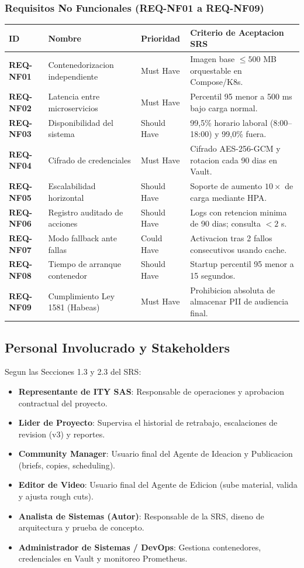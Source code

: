 \documentclass[11pt,a4paper]{article}
\begin{document}
\subsubsection*{Requisitos No Funcionales (REQ-NF01 a REQ-NF09)}
\begin{longtable}{p{2.2cm}p{4.5cm}p{2.5cm}p{5.8cm}}
\toprule
ID & Nombre & Prioridad & Criterio de Aceptacion SRS \\
\midrule
\endhead
\bottomrule
\endfoot
\textbf{REQ-NF01} & Contenedorizacion independiente & Must Have & Imagen base $\le 500$ MB orquestable en Compose/K8s. \\
\textbf{REQ-NF02} & Latencia entre microservicios & Must Have & Percentil 95 menor a 500 ms bajo carga normal. \\
\textbf{REQ-NF03} & Disponibilidad del sistema & Should Have & 99,5\% horario laboral (8:00--18:00) y 99,0\% fuera. \\
\textbf{REQ-NF04} & Cifrado de credenciales & Must Have & Cifrado AES-256-GCM y rotacion cada 90 dias en Vault. \\
\textbf{REQ-NF05} & Escalabilidad horizontal & Should Have & Soporte de aumento $10\times$ de carga mediante HPA. \\
\textbf{REQ-NF06} & Registro auditado de acciones & Should Have & Logs con retencion minima de 90 dias; consulta $<2$ s. \\
\textbf{REQ-NF07} & Modo fallback ante fallas & Could Have & Activacion tras 2 fallos consecutivos usando cache. \\
\textbf{REQ-NF08} & Tiempo de arranque contenedor & Should Have & Startup percentil 95 menor a 15 segundos. \\
\textbf{REQ-NF09} & Cumplimiento Ley 1581 (Habeas) & Must Have & Prohibicion absoluta de almacenar PII de audiencia final. \\
\end{longtable}

\subsection{Personal Involucrado y Stakeholders}\label{_partes_interesadas_stakeholders}
Segun las Secciones 1.3 y 2.3 del SRS:
\begin{itemize}
  \item \textbf{Representante de ITY SAS}: Responsable de operaciones y aprobacion contractual del proyecto.
  \item \textbf{Lider de Proyecto}: Supervisa el historial de retrabajo, escalaciones de revision (v3) y reportes.
  \item \textbf{Community Manager}: Usuario final del Agente de Ideacion y Publicacion (briefs, copies, scheduling).
  \item \textbf{Editor de Video}: Usuario final del Agente de Edicion (sube material, valida y ajusta rough cuts).
  \item \textbf{Analista de Sistemas (Autor)}: Responsable de la SRS, diseno de arquitectura y prueba de concepto.
  \item \textbf{Administrador de Sistemas / DevOps}: Gestiona contenedores, credenciales en Vault y monitoreo Prometheus.
\end{itemize}
\end{document}
